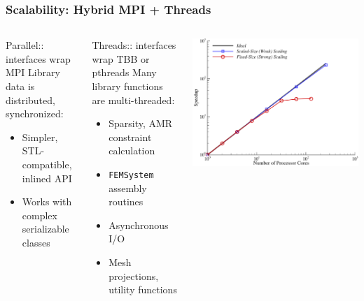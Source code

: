 \documentclass[mathserif]{beamer}
\begin{document}
\begin{frame}
\frametitle{Scalability: Hybrid MPI + Threads}

\begin{columns}
\begin{block}{Parallel:: interfaces wrap MPI}
Library data is distributed, synchronized:
\begin{itemize}
	\item Simpler, STL-compatible, inlined API
	\item Works with complex serializable classes
\end{itemize}
\end{block}

\begin{block}{Threads:: interfaces wrap TBB or pthreads}
Many library functions are multi-threaded:
\begin{itemize}
	\item Sparsity, AMR constraint calculation
	\item {\texttt{FEMSystem}} assembly routines
	\item Asynchronous I/O
	\item Mesh projections, utility functions
\end{itemize}
\end{block}

\center
\includegraphics[width=.8\textwidth]{fins_speedup}


\end{columns}
\end{frame}
\end{document}
